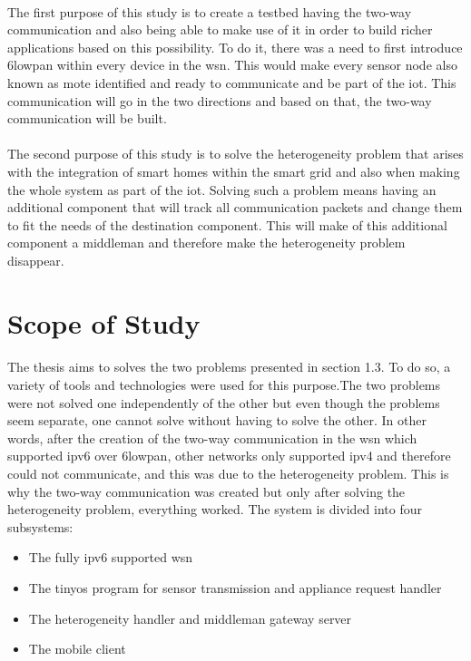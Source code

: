 \documentclass[oneside,12pt,a4paper,final]{book}
\begin{document}
\paragraph{}
The first purpose of this study is to create a testbed having the two-way communication and also being able to make use of it in order to build richer applications based on this possibility. To do it, there was a need to first introduce \gls{6lowpan} within every device in the \gls{wsn}. This would make every sensor node also known as mote identified and ready to communicate and be part of the \gls{iot}. This communication will go in the two directions and based on that, the two-way communication will be built.
\paragraph{}
The second purpose of this study is to solve the heterogeneity problem that arises with the integration of smart homes within the smart grid and also when making the whole system as part of the \gls{iot}. Solving such a problem means having an additional component that will track all communication packets and change them to fit the needs of the destination component. This will make of this additional component a middleman and therefore make the heterogeneity problem disappear.

\section{Scope of Study}
\paragraph{}
The thesis aims to solves the two problems presented in section 1.3. To do so, a variety of tools and technologies were used for this purpose.The two problems were not solved one independently of the other but even though the problems seem separate, one cannot solve without having to solve the other. In other words, after the creation of the two-way communication in the \gls{wsn} which supported \gls{ipv6} over \gls{6lowpan}, other networks only supported \gls{ipv4} and therefore could not communicate, and this was due to the heterogeneity problem. This is why the two-way communication was created but only after solving the heterogeneity problem, everything worked.
The system is divided into four subsystems:
\begin{itemize}
\item The fully \gls{ipv6} supported \gls{wsn}
\item The \gls{tinyos} program for sensor transmission and appliance request handler
\item The heterogeneity handler and middleman gateway server
\item The mobile client
\end{itemize}
\end{document}

